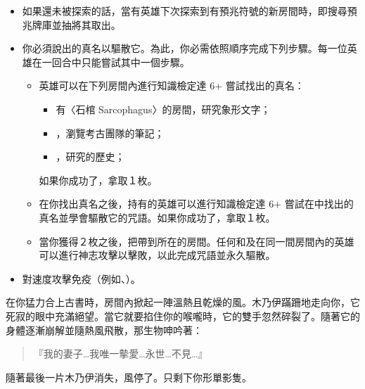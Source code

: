 \vspace*{-1em}
\begin{itemize}
  \item 如果還未被探索的話，當有英雄下次探索到有預兆符號的新房間時，即搜尋預兆牌庫並抽將其取出。
  \item 你必須說出的真名以驅散它。為此，你必需依照順序完成下列步驟。每一位英雄在一回合中只能嘗試其中一個步驟。
    \begin{itemize}
      \item 英雄可以在下列房間內進行知識檢定達 6+ 嘗試找出的真名：
        \begin{itemize}
          \item 有〈石棺 Sarcophagus〉的房間，研究象形文字；
          \item {}，瀏覽考古團隊的筆記；
          \item {}，研究的歷史；
        \end{itemize}
        如果你成功了，拿取１枚。
      \item 在你找出真名之後，持有的英雄可以進行知識檢定達 6+ 嘗試在中找出的真名並學會驅散它的咒語。如果你成功了，拿取１枚。
      \item 當你獲得２枚之後，把帶到所在的房間。任何和及在同一間房間內的英雄可以進行神志攻擊以擊敗，以此完成咒語並永久驅散。
    \end{itemize}
  \item {}對速度攻擊免疫（例如、）。
\end{itemize}

\begin{HauntStory}
  在你猛力合上古書時，房間內掀起一陣溫熱且乾燥的風。木乃伊蹣跚地走向你，它死寂的眼中充滿絕望。當它就要掐住你的喉嚨時，它的雙手忽然碎裂了。隨著它的身體逐漸崩解並隨熱風飛散，那生物呻吟著：

  \begin{quote}
    『我的妻子…我唯一摰愛…永世…不見…』
  \end{quote}

  隨著最後一片木乃伊消失，風停了。只剩下你形單影隻。
\end{HauntStory}

